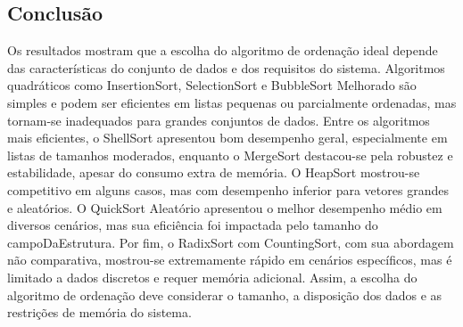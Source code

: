 \documentclass[a4paper, 12pt]{article}
\begin{document}
\subsection{Conclusão}
Os resultados mostram que a escolha do algoritmo de ordenação ideal depende das características do conjunto de dados e dos requisitos do sistema. Algoritmos quadráticos como InsertionSort, SelectionSort e BubbleSort Melhorado são simples e podem ser eficientes em listas pequenas ou parcialmente ordenadas, mas tornam-se inadequados para grandes conjuntos de dados. Entre os algoritmos mais eficientes, o ShellSort apresentou bom desempenho geral, especialmente em listas de tamanhos moderados, enquanto o MergeSort destacou-se pela robustez e estabilidade, apesar do consumo extra de memória. O HeapSort mostrou-se competitivo em alguns casos, mas com desempenho inferior para vetores grandes e aleatórios. O QuickSort Aleatório apresentou o melhor desempenho médio em diversos cenários, mas sua eficiência foi impactada pelo tamanho do campoDaEstrutura. Por fim, o RadixSort com CountingSort, com sua abordagem não comparativa, mostrou-se extremamente rápido em cenários específicos, mas é limitado a dados discretos e requer memória adicional. Assim, a escolha do algoritmo de ordenação deve considerar o tamanho, a disposição dos dados e as restrições de memória do sistema.
\end{document}
